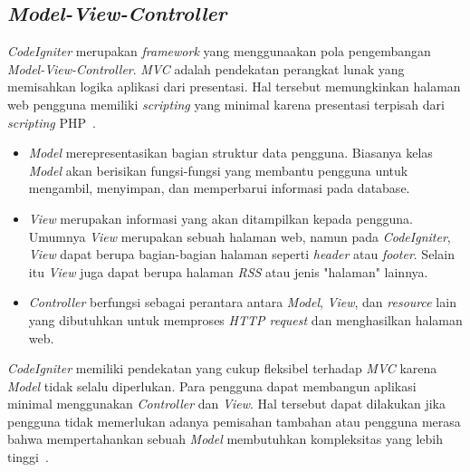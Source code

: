 \subsection{\textit{Model-View-Controller}}
\textit{CodeIgniter} merupakan \textit{framework} yang menggunaakan pola pengembangan \textit{Model-View-Controller}. \textit{MVC} adalah pendekatan perangkat lunak yang memisahkan logika aplikasi dari presentasi. Hal tersebut memungkinkan halaman web pengguna memiliki \textit{scripting} yang minimal karena presentasi terpisah dari \textit{scripting} PHP~\cite{bcit:17:cidoc}. \\
\begin{itemize}
	\item \textit{Model} merepresentasikan bagian struktur data pengguna. Biasanya kelas \textit{Model} akan berisikan fungsi-fungsi yang membantu pengguna untuk mengambil, menyimpan, dan memperbarui informasi pada database.
	\item \textit{View} merupakan informasi yang akan ditampilkan kepada pengguna. Umumnya \textit{View} merupakan sebuah halaman web, namun pada \textit{CodeIgniter}, \textit{View} dapat berupa bagian-bagian halaman seperti \textit{header} atau \textit{footer}. Selain itu \textit{View} juga dapat berupa halaman \textit{RSS} atau jenis "halaman" lainnya.
	\item \textit{Controller} berfungsi sebagai perantara antara \textit{Model}, \textit{View}, dan \textit{resource} lain yang dibutuhkan untuk memproses \textit{HTTP request} dan menghasilkan halaman web.
\end{itemize}
\textit{CodeIgniter} memiliki pendekatan yang cukup fleksibel terhadap \textit{MVC} karena \textit{Model} tidak selalu diperlukan. Para pengguna dapat membangun aplikasi minimal  menggunakan \textit{Controller} dan \textit{View}. Hal tersebut dapat dilakukan jika pengguna tidak memerlukan adanya pemisahan tambahan atau pengguna merasa bahwa mempertahankan sebuah \textit{Model} membutuhkan kompleksitas yang lebih tinggi~\cite{bcit:17:cidoc}. 

